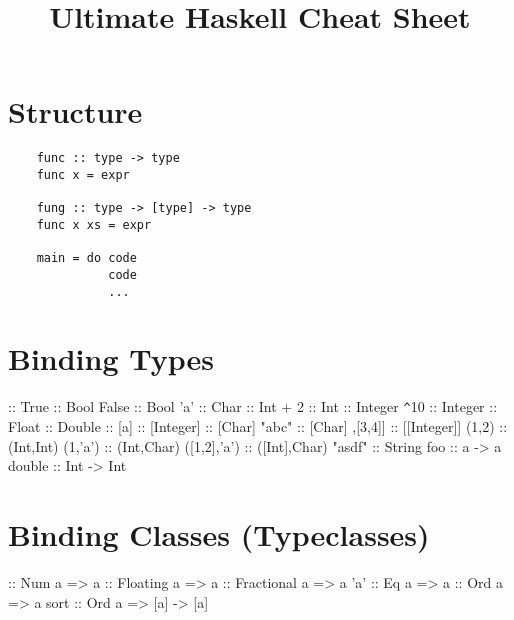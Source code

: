 \documentclass{refcard}
\title{Ultimate Haskell Cheat Sheet}
\begin{document}
\maketitle

\section{Structure}

\begin{verbatim}
	func :: type -> type
	func x = expr

	fung :: type -> [type] -> type
	func x xs = expr

	main = do code
	          code
	          ...
\end{verbatim}


\section{Binding Types}

\begin{ldesc}
	               \s::\s{}
	\li[boolean]                True :: Bool
	\li                         False :: Bool
	\li[character]              'a' :: Char
	 :: Int
	 + 2 :: Int
	 :: Integer
	\verb+^+10 :: Integer
	 :: Float 
	 :: Double
	\li[list]                   [] :: [a]
	\li[]                       [1,2,3] :: [Integer]
	\li[]                       ['a','b','c'] :: [Char]
	\li                         "abc" :: [Char]
	\li[]                       [[1,2],[3,4]] :: [[Integer]]
	\li[tuple]                  (1,2) :: (Int,Int)
	\li                         (1,'a') :: (Int,Char)
	\li                         ([1,2],'a') :: ([Int],Char)
	\li[string]                 "asdf" :: String
	\li[functions]              foo :: a -> a
	\li                         double :: Int -> Int
\end{ldesc}


\section{Binding Classes (Typeclasses)}

\begin{ldesc}
	 :: Num a => a
	 :: Floating a => a
	 :: Fractional a => a
	\li[Equatable (==)]                'a' :: Eq a => a
	 :: Ord a => a
	\li                                sort :: 
	\li                                \s\s\s\s Ord a => [a] -> [a]
\end{ldesc}
\end{document}
